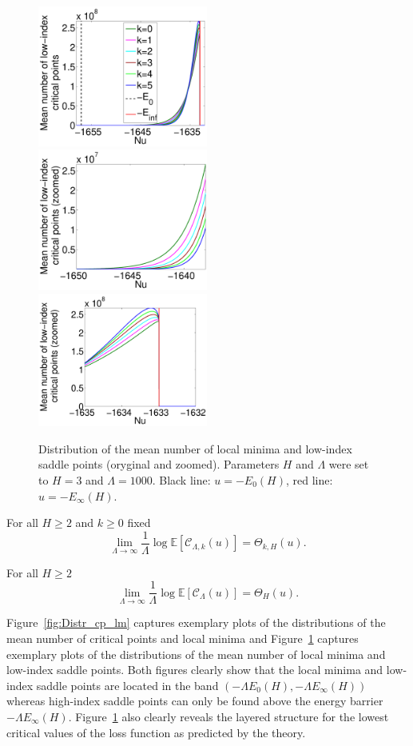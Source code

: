 \documentclass[twoside]{article}
\begin{document}
\begin{figure}[htp!]
  \center
\includegraphics[width = 2.2in]{Distr_lm_sp_li.pdf} 
\includegraphics[width = 2.2in]{Distr_lm_sp_li_zoomed_left.pdf} 
\includegraphics[width = 2.2in]{Distr_lm_sp_li_zoomed_right.pdf} 
\caption{Distribution of the mean number of local minima and low-index saddle points (oryginal and zoomed). Parameters $H$ and $\Lambda$ were set to $H = 3$ and $\Lambda = 1000$. Black line: $u = -E_0(H)$, red line: $u = -E_{\infty}(H)$.}
\label{fig:Distr_lm_sp}
\end{figure}

\begin{theorem}
For all $H \geq 2$ and $k \geq 0$ fixed
\[\lim_{\Lambda \rightarrow \infty}\frac{1}{\Lambda}\log\mathbb{E}[\mathcal{C}_{\Lambda,k}(u)] = \Theta_{k,H}(u).
\]
\label{thm:lmsp}
\end{theorem}
\begin{theorem}
For all $H \geq 2$
\[\lim_{\Lambda \rightarrow \infty}\frac{1}{\Lambda}\log\mathbb{E}[\mathcal{C}_{\Lambda}(u)] = \Theta_{H}(u).
\]
\label{thm:cp}
\end{theorem}
Figure~\ref{fig:Distr_cp_lm} captures exemplary plots of the distributions of the mean number of critical points and local minima and Figure~\ref{fig:Distr_lm_sp} captures exemplary plots of the distributions of the mean number of local minima and low-index saddle points. Both figures clearly show that the local minima and low-index saddle points are located in the band $\left(-\Lambda E_0(H),-\Lambda E_{\infty}(H)\right)$ whereas high-index saddle points can only be found above the energy barrier $-\Lambda E_{\infty}(H)$. Figure~\ref{fig:Distr_lm_sp} also clearly reveals the layered structure for the lowest critical values of the loss function as predicted by the theory. 
\end{document}
